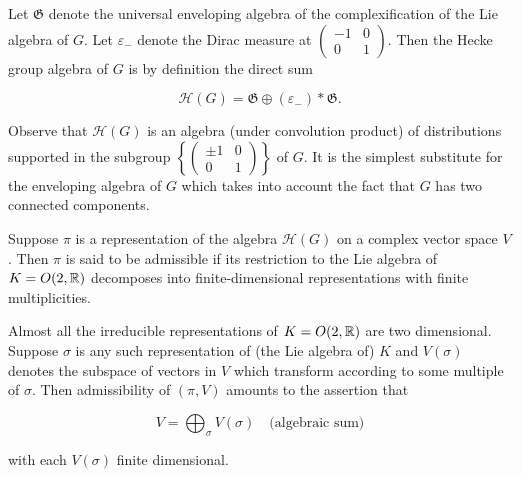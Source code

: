 \begin{definition}\label{def:4.1}

Let $\mathfrak{G}$ denote the universal enveloping algebra of the complexification of the Lie algebra of $G$. Let $\varepsilon_{-}$ denote the Dirac measure at $\begin{pmatrix} -1 & 0 \\ 0 & 1 \end{pmatrix}$. Then the Hecke group algebra of $G$ is by definition the direct sum

\[
\mathcal{H}(G) = \mathfrak{G} \oplus (\varepsilon_{-}) * \mathfrak{G}.
\]

\end{definition}

Observe that $\mathcal{H}(G)$ is an algebra (under convolution product) of distributions supported in the subgroup $\left\{\begin{pmatrix} \pm 1 & 0 \\ 0 & 1 \end{pmatrix}\right\}$ of $G$. It is the simplest substitute for the enveloping algebra of $G$ which takes into account the fact that $G$ has two connected components.

\begin{definition}\label{def:4.2}

Suppose $\pi$ is a representation of the algebra $\mathcal{H}(G)$ on a complex vector space $V$. Then $\pi$ is said to be admissible if its restriction to the Lie algebra of $K = O(2,\mathbb{R})$ decomposes into finite-dimensional representations with finite multiplicities.

\end{definition}

\begin{remark}\label{rem:4.3}

Almost all the irreducible representations of $K = O(2,\mathbb{R})$ are two dimensional. Suppose $\sigma$ is any such representation of (the Lie algebra of) $K$ and $V(\sigma)$ denotes the subspace of vectors in $V$ which transform according to some multiple of $\sigma$. Then admissibility of $(\pi, V)$ amounts to the assertion that

\begin{equation}\label{eq:4.1}
V = \bigoplus_{\sigma} V(\sigma) \quad \text{(algebraic sum)}\tag{4.1}
\end{equation}

with each $V(\sigma)$ finite dimensional.

\end{remark}


